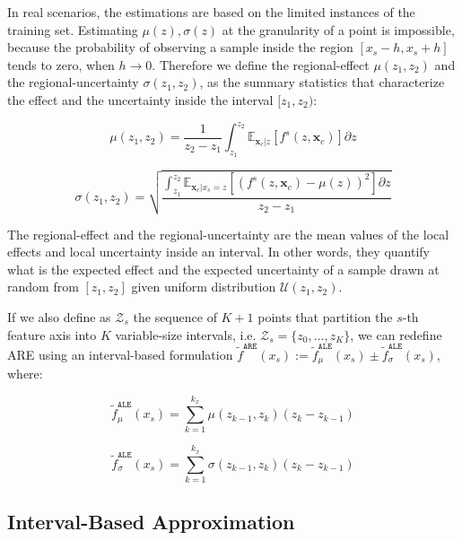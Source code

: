 \documentclass[twoside]{article}
\newcommand{\xc}{\mathbf{x}_c}
\begin{document}
In real scenarios, the estimations are based on the limited instances
of the training set. Estimating \(\mu(z), \sigma(z)\) at the
granularity of a point is impossible, because the probability of
observing a sample inside the region \([x_s - h, x_s + h]\) tends to
zero, when \(h \to 0\). Therefore we define the regional-effect
\(\mu(z_1, z_2)\) and the regional-uncertainty \(\sigma(z_1, z_2)\),
as the summary statistics that characterize the effect and the
uncertainty inside the interval \([z_1, z_2)\):

\begin{equation}
  \label{eq:mu_bin}
  \mu(z_1, z_2) = \frac{1}{z_2 - z_1} \int_{z_1}^{z_2}
  \mathbb{E}_{\xc|z}\left [f^s(z, \xc) \right ] \partial z
\end{equation}

\noindent

\begin{equation}
  \label{eq:var_bin}
  \sigma(z_1, z_2) = \sqrt{\frac{\int_{z_1}^{z_2}
  \mathbb{E}_{\xc|x_s=z} \left [ (f^s(z, \xc) - \mu(z) )^2 \right] \partial z}{z_2 - z_1}}
\end{equation}

%
The regional-effect and the regional-uncertainty are the mean values
of the local effects and local uncertainty inside an interval. In
other words, they quantify what is the expected effect and the
expected uncertainty of a sample drawn at random from \([z_1, z_2]\)
given uniform distribution \(\mathcal{U}(z_1, z_2)\).

If we also define as \(\mathcal{Z}_s\) the sequence of \(K+1\) points
that partition the \(s\)-th feature axis into \(K\) variable-size
intervals, i.e. \(\mathcal{Z}_s = \{z_0, \ldots, z_K\}\), we can
redefine ARE using an interval-based formulation
\(\tilde{f}^{\mathtt{ARE}}(x_s):= \tilde{f}^{\mathtt{ALE}}_{\mu}(x_s)
\pm \tilde{f}^{\mathtt{ALE}}_{\sigma}(x_s)\), where:

\begin{equation}
  \label{eq:ALE_2}
  \tilde{f}^{\mathtt{ALE}}_{\mu}(x_s) = \sum_{k=1}^{k_x} \mu(z_{k-1}, z_k) (z_k - z_{k-1})
\end{equation}

\begin{equation}
  \label{eq:ALE_accumulated_var}
  \tilde{f}^{\mathtt{ALE}}_{\sigma}(x_s) =  \sum_{k=1}^{k_x} \sigma(z_{k-1}, z_k) (z_k - z_{k-1})
\end{equation}
%

\subsection{Interval-Based Approximation}
\end{document}
